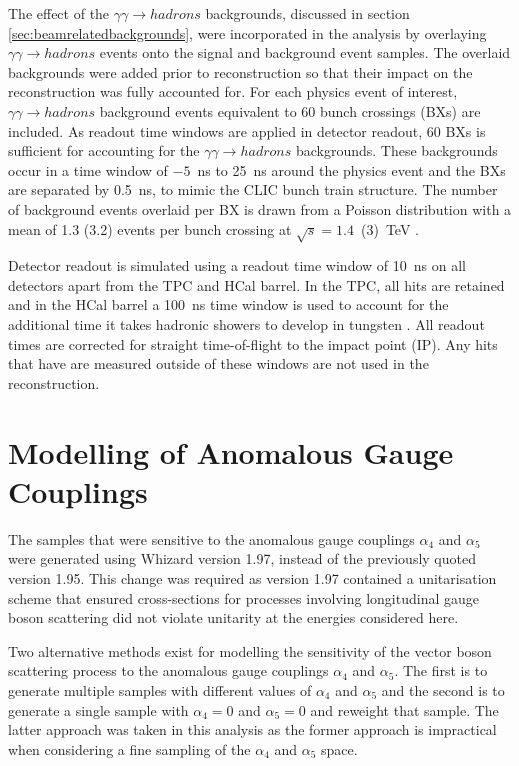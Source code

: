 The effect of the $\gamma\gamma \rightarrow hadrons$ backgrounds, discussed in section \ref{sec:beamrelatedbackgrounds}, were incorporated in the analysis by overlaying $\gamma\gamma \rightarrow hadrons$ events onto the signal and background event samples.  The overlaid backgrounds were added prior to reconstruction so that their impact on the reconstruction was fully accounted for.  For each physics event of interest, $\gamma\gamma \rightarrow hadrons$ background events equivalent to 60 bunch crossings (BXs) are included.  As readout time windows are applied in detector readout, 60 BXs is sufficient for accounting for the $\gamma\gamma \rightarrow hadrons$ backgrounds.  These backgrounds occur in a time window of $-5$~ns to 25~ns around the physics event and the BXs are separated by 0.5~ns, to mimic the CLIC bunch train structure.  The number of background events overlaid per BX is drawn from a Poisson distribution with a mean of 1.3 (3.2) events per bunch crossing at $\sqrt{s}=1.4$~(3)~TeV \cite{Linssen:2012hp}.  

Detector readout is simulated using a readout time window of 10~ns on all detectors apart from the TPC and HCal barrel.  In the TPC, all hits are retained and in the HCal {barrel} a 100~ns time window is used to account for the additional time it takes hadronic showers to develop in tungsten \cite{Linssen:2012hp}.  All readout times are corrected for straight time-of-flight to the impact point (IP).  Any hits that have are measured outside of these windows are not used in the reconstruction.   
 

\section{Modelling of Anomalous Gauge Couplings}
\label{sec:modellingofanomalouscouplings}
The samples that were sensitive to the anomalous gauge couplings $\alpha_{4}$ and $\alpha_{5}$ were generated using Whizard version 1.97, instead of the previously quoted version 1.95.  This change was required as version 1.97 contained a unitarisation scheme that ensured cross-sections for processes involving longitudinal gauge boson scattering did not violate unitarity at the energies considered here.  

Two alternative methods exist for modelling the sensitivity of the vector boson scattering process to the anomalous gauge couplings $\alpha_{4}$ and $\alpha_{5}$.  The first is to generate multiple samples with different values of $\alpha_{4}$ and $\alpha_{5}$ and the second is to generate a single sample with $\alpha_{4} = 0$ and $\alpha_{5} = 0$ and reweight that sample.  The latter approach was taken in this analysis as the former approach is impractical when considering a fine sampling of the $\alpha_{4}$ and $\alpha_{5}$ space.

